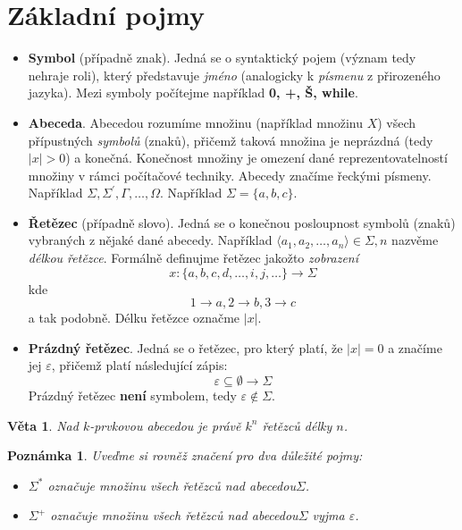 \documentclass[10pt, a4paper, titlepage]{article}
\theoremstyle{note}
\newtheorem{veta}{Věta}
\newtheorem{poznamka}{Poznámka}
\begin{document}
\section{Základní pojmy}
\begin{itemize}
\item
\textbf{Symbol} (případně znak). Jedná se o syntaktický pojem (význam tedy nehraje roli), který představuje \emph{jméno} (analogicky k \emph{písmenu} z přirozeného jazyka).
Mezi symboly počítejme například \textbf{0, +, Š, while}.

\item
\textbf{Abeceda}. Abecedou rozumíme množinu (například množinu $X$) všech přípustných \emph{symbolů} (znaků), přičemž taková množina je neprázdná (tedy $|x|>0$) a konečná.
Konečnost množiny je omezení dané reprezentovatelností množiny v rámci počítačové techniky.
Abecedy značíme řeckými písmeny. Například $\Sigma, \Sigma^{'}, \Gamma, \ldots, \Omega$.
Například $\Sigma = \lbrace a, b, c \rbrace$.

\item
\textbf{Řetězec} (případně slovo). Jedná se o konečnou posloupnost symbolů (znaků) vybraných z nějaké dané abecedy.
Například $\langle a_{1}, a_{2}, \ldots, a_{n} \rangle \in \Sigma, n$ nazvěme \emph{délkou řetězce}.
Formálně definujme řetězec jakožto \emph{zobrazení}
$$
x : \lbrace a, b, c, d, \ldots, i, j, \ldots \rbrace \rightarrow \Sigma
$$
kde
$$
1 \rightarrow a, 2 \rightarrow b, 3 \rightarrow c
$$ a tak podobně.
Délku řetězce označme $|x|$.

\item
\textbf{Prázdný řetězec}. Jedná se o řetězec, pro který platí, že $|x| = 0$ a značíme jej $\varepsilon$, přičemž platí následující zápis:
$$
\varepsilon \subseteq \emptyset \rightarrow \Sigma
$$
Prázdný řetězec \textbf{není} symbolem, tedy $\varepsilon \notin \Sigma$.
\end{itemize}

\begin{veta}
Nad $k$-prvkovou abecedou je právě $k^{n}$ řetězců délky $n$.
\end{veta}


\begin{poznamka}
Uveďme si rovněž značení pro dva důležité pojmy:

\begin{itemize}
\item
$\Sigma^{*}$ označuje množinu všech řetězců nad abecedou$\Sigma$.

\item
$\Sigma^{+}$ označuje množinu všech řetězců nad abecedou$\Sigma$ vyjma $\varepsilon$.
\end{itemize}
\end{poznamka}
\end{document}
